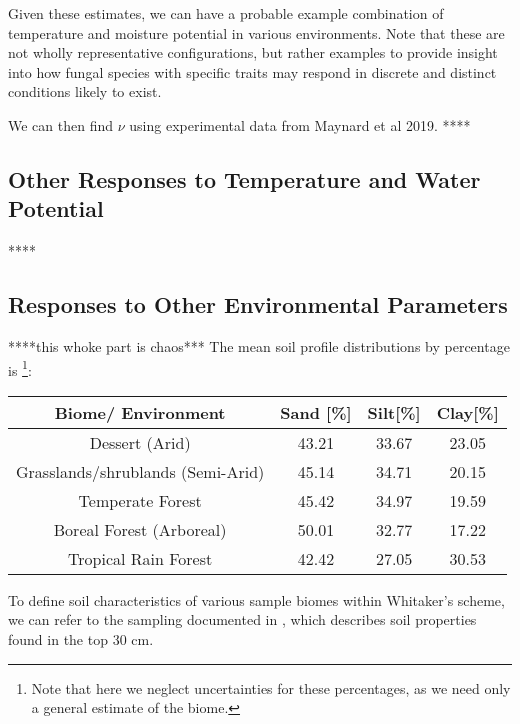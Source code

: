 \documentclass{article}
\begin{document}
Given these estimates, we can have a probable example combination of temperature and moisture potential in various environments. Note that these are not wholly representative configurations, but rather examples to provide insight into how fungal species with specific traits may respond in discrete and distinct conditions likely to exist. 

We can then find $\nu$ using experimental data from Maynard et al 2019. ****

\subsection{Other Responses to Temperature and Water Potential}

****

\subsection{Responses to Other Environmental Parameters}
****this whoke part is chaos***
The mean soil profile distributions by percentage is \cite{Zhao2019} \footnote{Note that here we neglect uncertainties for these percentages, as we need only a general estimate of the biome.}: 
\begin{center}
 \begin{tabular}{|c c c c|} 
 \hline
 Biome/ Environment & Sand [\%] & Silt[\%] & Clay[\%] \\ [0.5ex] 
 \hline\hline
 Dessert (Arid) & 43.21 & 33.67 & 23.05 \\ 
 \hline
 Grasslands/shrublands (Semi-Arid) & 45.14 & 34.71 & 20.15 \\
 \hline
 Temperate Forest & 45.42 & 34.97 & 19.59 \\
 \hline
 Boreal Forest (Arboreal) & 50.01 & 32.77 & 17.22 \\
 \hline
 Tropical Rain Forest & 42.42 & 27.05 & 30.53 \\ [1ex] 
 \hline
\end{tabular}
\end{center}


To define soil characteristics of various sample biomes within Whitaker's scheme, we can refer to the sampling documented in {}, which describes soil properties found in the top 30 cm.
\end{document}
